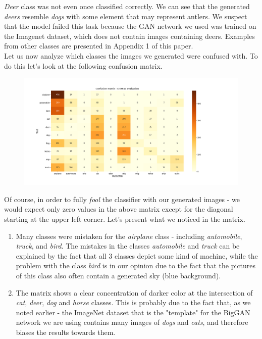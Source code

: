 \documentclass[12pt,a4paper,openany]{book}
\begin{document}
\newline 
\noindent \textit{Deer} class was not even once classified correctly. We can see that the generated \textit{deers} resemble \textit{dogs} with some element that may represent antlers. We suspect that the model failed this task because the GAN network we used was trained on the Imagenet dataset, which does not contain images containing deers.
Examples from other classes are presented in Appendix 1 of this paper. \\
\noindent Let us now analyze which classes the images we generated were confused with. To do this let's look at the following confusion matrix.
\begin{figure}[ht!]
    \includegraphics[scale=0.4]{figs/cifar10_examples/confusion_matrix.png}
\end{figure}
Of course, in order to fully \textit{fool} the classifier with our generated images - we would expect only zero values in the above matrix except for the diagonal starting at the upper left corner.   Let's present what we noticed in the matrix.
\begin{enumerate}
\item Many classes were mistaken for the \textit{airplane} class - including \textit{automobile}, \textit{truck}, and \textit{bird}. The mistakes in the classes \textit{automobile} and \textit{truck} can be explained by the fact that all 3 classes depict some kind of machine, while the problem with the class \textit{bird} is in our opinion due to the fact that the pictures of this class also often contain a generated sky (blue background).
\item The matrix shows a clear concentration of darker color at the intersection of \textit{cat}, \textit{deer}, \textit{dog} and \textit{horse} classes. This is probably due to the fact that, as we noted earlier - the ImageNet dataset that is the "template" for the BigGAN network we are using contains many images of \textit{dogs} and \textit{cats}, and therefore biases the results towards them.
\end{enumerate}
\end{document}
